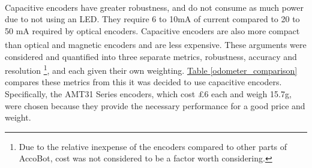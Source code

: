 \documentclass[11pt]{article}		%
\newcommand{\supercite}[1]{\textsuperscript{\cite{#1}}}		%
\newcommand{\tableref}[1]{\hyperref[#1]{Table \ref*{#1}}}     %
\newcommand{\sectref}[1]{\hyperref[#1]{Section \ref*{#1}}}     %
\begin{document}
            \\
            \hspace*{3ex}Capacitive encoders have greater robustness, and do not consume as much power due to not using an LED. They require 6 to 10mA of current compared to 20 to 50 mA required by optical encoders. Capacitive encoders are also more compact than optical and magnetic encoders and are less expensive\supercite{Encoders}. These arguments were considered and quantified into three separate metrics, robustness, accuracy and resolution \footnote{Due to the relative inexpense of the encoders compared to other parts of AccoBot, cost was not considered to be a factor worth considering.}, and each given their own weighting. \tableref{odometer_comparison} compares these metrics from this it was decided to use capacitive encoders. Specifically, the AMT31 Series encoders, which cost £6 each and weigh 15.7g, were chosen because they provide the necessary performance for a good price and weight. 
\end{document}
